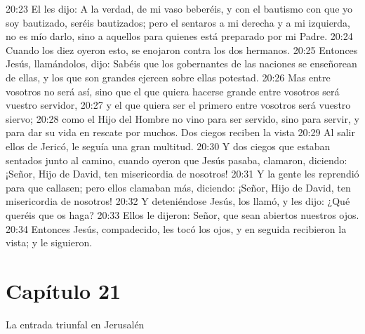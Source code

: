 20:23 El les dijo: A la verdad, de mi vaso beberéis, y con el bautismo con que yo soy bautizado, seréis bautizados; pero el sentaros a mi derecha y a mi izquierda, no es mío darlo, sino a aquellos para quienes está preparado por mi Padre. 
20:24 Cuando los diez oyeron esto, se enojaron contra los dos hermanos. 
20:25 Entonces Jesús, llamándolos, dijo: Sabéis que los gobernantes de las naciones se enseñorean de ellas, y los que son grandes ejercen sobre ellas potestad. 
20:26 Mas entre vosotros no será así, sino que el que quiera hacerse grande entre vosotros será vuestro servidor, 
20:27 y el que quiera ser el primero entre vosotros será vuestro siervo; 
20:28 como el Hijo del Hombre no vino para ser servido, sino para servir, y para dar su vida en rescate por muchos. 
Dos ciegos reciben la vista  
20:29 Al salir ellos de Jericó, le seguía una gran multitud. 
20:30 Y dos ciegos que estaban sentados junto al camino, cuando oyeron que Jesús pasaba, clamaron, diciendo: ¡Señor, Hijo de David, ten misericordia de nosotros! 
20:31 Y la gente les reprendió para que callasen; pero ellos clamaban más, diciendo: ¡Señor, Hijo de David, ten misericordia de nosotros! 
20:32 Y deteniéndose Jesús, los llamó, y les dijo: ¿Qué queréis que os haga? 
20:33 Ellos le dijeron: Señor, que sean abiertos nuestros ojos. 
20:34 Entonces Jesús, compadecido, les tocó los ojos, y en seguida recibieron la vista; y le siguieron. 
  
\section*{Capítulo 21}
La entrada triunfal en Jerusalén  

